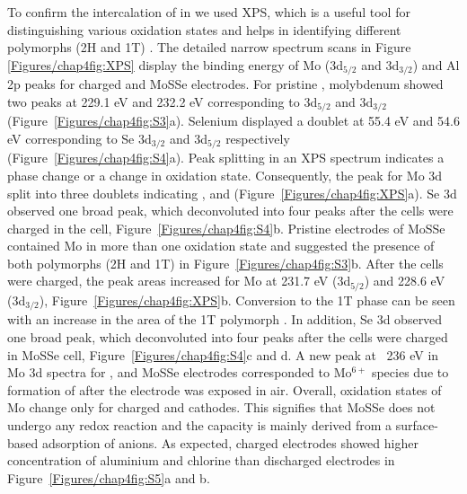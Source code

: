 To confirm the intercalation of  in  we used XPS, which is a useful tool for distinguishing various oxidation states and helps in identifying different polymorphs (2H and 1T) \cite{fan_hybrid_2017}. The detailed narrow spectrum scans in Figure \ref{Figures/chap4fig:XPS} display the binding energy of Mo (3d$_{5/2}$ and 3d$_{3/2}$) and Al 2p peaks for charged  and MoSSe electrodes. For pristine , molybdenum showed two peaks at 229.1 eV and 232.2 eV corresponding to 3d$_{5/2}$ and 3d$_{3/2}$ (Figure\ \ref{Figures/chap4fig:S3}a). Selenium displayed a doublet at 55.4 eV and 54.6 eV corresponding to Se 3d$_{3/2}$ and 3d$_{5/2}$ respectively (Figure\ \ref{Figures/chap4fig:S4}a). Peak splitting in an XPS spectrum indicates a phase change or a change in oxidation state. Consequently, the peak for Mo 3d split into three doublets indicating ,  and  (Figure\ \ref{Figures/chap4fig:XPS}a). Se 3d observed one broad peak, which deconvoluted into four peaks after the cells were charged in the  cell, Figure\ \ref{Figures/chap4fig:S4}b. Pristine electrodes of MoSSe contained Mo in more than one oxidation state and suggested the presence of both polymorphs (2H and 1T) in Figure\ \ref{Figures/chap4fig:S3}b. After the cells were charged, the peak areas increased for Mo at 231.7 eV (3d$_{5/2}$) and 228.6 eV (3d$_{3/2}$), Figure\ \ref{Figures/chap4fig:XPS}b. Conversion to the 1T phase can be seen with an increase in the area of the 1T polymorph \cite{fan_hybrid_2017}. In addition, Se 3d observed one broad peak, which deconvoluted into four peaks after the cells were charged in MoSSe cell, Figure\ \ref{Figures/chap4fig:S4}c and d. A new peak at ~236 eV in Mo 3d spectra for ,  and MoSSe electrodes corresponded to Mo$^{6+}$ species due to formation of  after the electrode was exposed in air. Overall, oxidation states of Mo change only for charged  and  cathodes. This signifies that MoSSe does not undergo any redox reaction and the capacity is mainly derived from a surface-based adsorption of anions. As expected, charged electrodes showed higher concentration of aluminium and chlorine than discharged electrodes in Figure\ \ref{Figures/chap4fig:S5}a and b. 

